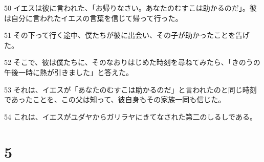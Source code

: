 \par 50 イエスは彼に言われた、「お帰りなさい。あなたのむすこは助かるのだ」。彼は自分に言われたイエスの言葉を信じて帰って行った。
\par 51 その下って行く途中、僕たちが彼に出会い、その子が助かったことを告げた。
\par 52 そこで、彼は僕たちに、そのなおりはじめた時刻を尋ねてみたら、「きのうの午後一時に熱が引きました」と答えた。
\par 53 それは、イエスが「あなたのむすこは助かるのだ」と言われたのと同じ時刻であったことを、この父は知って、彼自身もその家族一同も信じた。
\par 54 これは、イエスがユダヤからガリラヤにきてなされた第二のしるしである。

\chapter{5}

